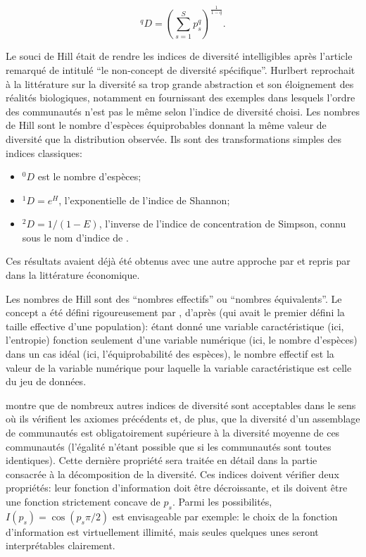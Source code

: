 \documentclass[
  11pt,
  french,
  a4paper,
  extrafontsizes,onecolumn,openright
  ]{memoir}
\providecommand{\tightlist}{%
  \setlength{\itemsep}{0pt}\setlength{\parskip}{0pt}}
\begin{document}
\begin{equation}
  \label{eq:Hill1973}
  ^{q}\!D = {\left(\sum^S_{s=1}{p^q_s}\right)}^{\frac{1}{1-q}}.
\end{equation}

Le souci de Hill était de rendre les indices de diversité intelligibles après l'article remarqué de \textcite{Hurlbert1971} intitulé ``le non-concept de diversité spécifique''.
Hurlbert reprochait à la littérature sur la diversité sa trop grande abstraction et son éloignement des réalités biologiques, notamment en fournissant des exemples dans lesquels l'ordre des communautés n'est pas le même selon l'indice de diversité choisi.
Les nombres de Hill sont le nombre d'espèces équiprobables donnant la même valeur de diversité que la distribution observée.
Ils sont des transformations simples des indices classiques:

\begin{itemize}
\tightlist
\item
  \(^{0}\!D\) est le nombre d'espèces;
\item
  \(^{1}\!D=e^H\), l'exponentielle de l'indice de Shannon;
\item
  \(^{2}\!D={1}/{\left(1-E\right)}\), l'inverse de l'indice de concentration de Simpson, connu sous le nom d'indice de \textcite{Stoddart1983}.
\end{itemize}

Ces résultats avaient déjà été obtenus avec une autre approche par \textcite{MacArthur1965} et repris par \textcite{Adelman1969} dans la littérature économique.

Les nombres de Hill sont des ``nombres effectifs'' ou ``nombres équivalents''.
Le concept a été défini rigoureusement par \textcite{Gregorius1991}, d'après \textcite{Wright1931} (qui avait le premier défini la taille effective d'une population): étant donné une variable caractéristique (ici, l'entropie) fonction seulement d'une variable numérique (ici, le nombre d'espèces) dans un cas idéal (ici, l'équiprobabilité des espèces), le nombre effectif est la valeur de la variable numérique pour laquelle la variable caractéristique est celle du jeu de données.

\textcite{Gregorius2014} montre que de nombreux autres indices de diversité sont acceptables dans le sens où ils vérifient les axiomes précédents et, de plus, que la diversité d'un assemblage de communautés est obligatoirement supérieure à la diversité moyenne de ces communautés (l'égalité n'étant possible que si les communautés sont toutes identiques).
Cette dernière propriété sera traitée en détail dans la partie consacrée à la décomposition de la diversité.
Ces indices doivent vérifier deux propriétés: leur fonction d'information doit être décroissante, et ils doivent être une fonction strictement concave de \(p_s\).
Parmi les possibilités, \(I(p_s) = \cos{(p_s {\pi}/{2})}\) est envisageable par exemple: le choix de la fonction d'information est virtuellement illimité, mais seules quelques unes seront interprétables clairement.
\end{document}
